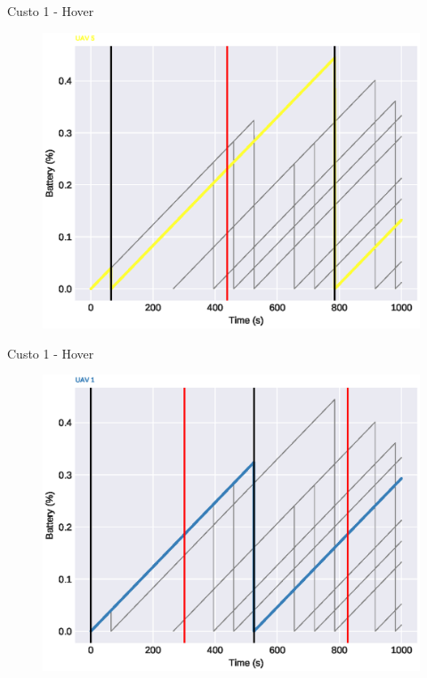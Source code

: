 \begin{frame}{Custo 1 - Hover}
                \begin{figure}[!htb]
                     \includegraphics[width=\textwidth]{custo_1/uav_hover_acum_uav_5.eps}
                 \end{figure}
            \end{frame}\begin{frame}{Custo 1 - Hover}
                \begin{figure}[!htb]
                     \includegraphics[width=\textwidth]{custo_1/uav_hover_acum_uav_1.eps}
                 \end{figure}

\end{frame}
